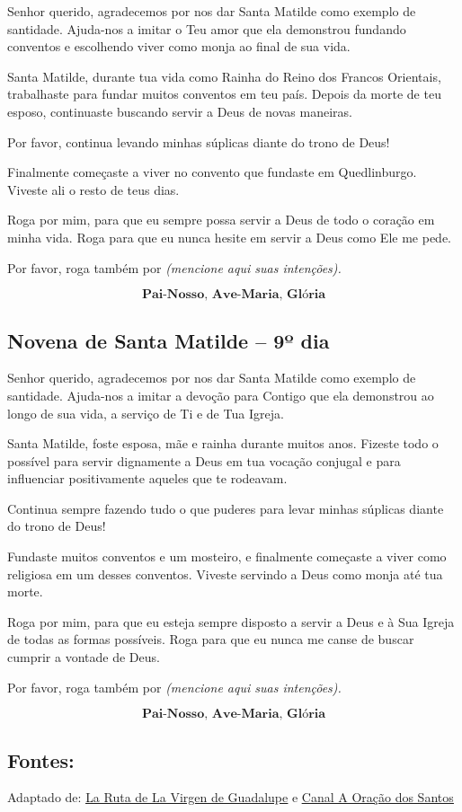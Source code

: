 \documentclass[a4paper,14pt]{extarticle} \usepackage[utf8]{inputenc}
\begin{document}
Senhor querido, agradecemos por nos dar Santa Matilde como exemplo de santidade. Ajuda-nos a imitar o Teu amor que ela demonstrou fundando conventos e escolhendo viver como monja ao final de sua vida.

Santa Matilde, durante tua vida como Rainha do Reino dos Francos Orientais, trabalhaste para fundar muitos conventos em teu país. Depois da morte de teu esposo, continuaste buscando servir a Deus de novas maneiras.

Por favor, continua levando minhas súplicas diante do trono de Deus!

Finalmente começaste a viver no convento que fundaste em Quedlinburgo. Viveste ali o resto de teus dias.

Roga por mim, para que eu sempre possa servir a Deus de todo o coração em minha vida. Roga para que eu nunca hesite em servir a Deus como Ele me pede.

Por favor, roga também por \textit{(mencione aqui suas intenções).}

\[\textbf{Pai-Nosso, Ave-Maria, Glória}\]


\subsection{Novena de Santa Matilde – 9º dia}



Senhor querido, agradecemos por nos dar Santa Matilde como exemplo de santidade. Ajuda-nos a imitar a devoção para Contigo que ela demonstrou ao longo de sua vida, a serviço de Ti e de Tua Igreja.

Santa Matilde, foste esposa, mãe e rainha durante muitos anos. Fizeste todo o possível para servir dignamente a Deus em tua vocação conjugal e para influenciar positivamente aqueles que te rodeavam.

Continua sempre fazendo tudo o que puderes para levar minhas súplicas diante do trono de Deus!

Fundaste muitos conventos e um mosteiro, e finalmente começaste a viver como religiosa em um desses conventos. Viveste servindo a Deus como monja até tua morte.

Roga por mim, para que eu esteja sempre disposto a servir a Deus e à Sua Igreja de todas as formas possíveis. Roga para que eu nunca me canse de buscar cumprir a vontade de Deus.

Por favor, roga também por \textit{(mencione aqui suas intenções).}

\[\textbf{Pai-Nosso, Ave-Maria, Glória}\]



\vfill

\begin{center}
\subsection*{Fontes:}
Adaptado de: {\color{blue} \underline{\href{https://larutadelavirgendeguadalupe.com/novena-de-santa-matilde/}{La Ruta de La Virgen de Guadalupe}} e {\color{blue} \underline{\href{https://youtube.com/playlist?list=PLN7jQwkJvdQoCTF1o4mfX_l-SMaw4goe0&si=srrIsdAAgNtQvnvw}{Canal A Oração dos Santos}}}}


\end{center}
\end{document}
